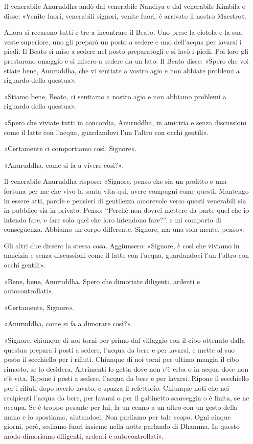 Il venerabile Anuruddha andò dal venerabile Nandiya e dal venerabile
Kimbila e disse: «Venite fuori, venerabili signori, venite fuori, è
arrivato il nostro Maestro».


Allora si recarono tutti e tre a incontrare il Beato. Uno prese la
ciotola e la sua veste superiore, uno gli preparò un posto a sedere e
uno dell’acqua per lavarsi i piedi. Il Beato si mise a sedere nel posto
preparatogli e si lavò i piedi. Poi loro gli prestarono omaggio e si
misero a sedere da un lato. Il Beato disse: «Spero che voi stiate bene,
Anuruddha, che vi sentiate a vostro agio e non abbiate problemi a
riguardo della questua».


«Stiamo bene, Beato, ci sentiamo a nostro agio e non abbiamo problemi a
riguardo della questua».


«Spero che viviate tutti in concordia, Anuruddha, in amicizia e senza
discussioni come il latte con l’acqua, guardandovi l’un l’altro con
occhi gentili».


«Certamente ci comportiamo così, Signore».


«Anuruddha, come si fa a vivere così?».


Il venerabile Anuruddha rispose: «Signore, penso che sia un profitto e
una fortuna per me che vivo la santa vita qui, avere compagni come
questi. Mantengo in essere atti, parole e pensieri di gentilezza
amorevole verso questi venerabili sia in pubblico sia in privato. Penso:
“Perché non dovrei mettere da parte quel che io intendo fare, e fare
solo quel che loro intendono fare?”. e mi comporto di conseguenza.
Abbiamo un corpo differente, Signore, ma una sola mente, penso».


Gli altri due dissero la stessa cosa. Aggiunsero: «Signore, è così che
viviamo in amicizia e senza discussioni come il latte con l’acqua,
guardandoci l’un l’altro con occhi gentili».


«Bene, bene, Anuruddha. Spero che dimoriate diligenti, ardenti e
autocontrollati».


«Certamente, Signore».


«Anuruddha, come si fa a dimorare così?».


«Signore, chiunque di noi torni per primo dal villaggio con il cibo
ottenuto dalla questua prepara i posti a sedere, l’acqua da bere e per
lavarsi, e mette al suo posto il secchiello per i rifiuti. Chiunque di
noi torni per ultimo mangia il cibo rimasto, se lo desidera. Altrimenti
lo getta dove non c’è erba o in acqua dove non c’è vita. Ripone i posti
a sedere, l’acqua da bere e per lavarsi. Ripone il secchiello per i
rifiuti dopo averlo lavato, e spazza il refettorio. Chiunque noti che
nei recipienti l’acqua da bere, per lavarsi o per il gabinetto
scarseggia o è finita, se ne occupa. Se è troppo pesante per lui, fa un
cenno a un altro con un gesto della mano e lo spostiamo, aiutandoci. Non
parliamo per tale scopo. Ogni cinque giorni, però, sediamo fuori insieme
nella notte parlando di Dhamma. In questo modo dimoriamo diligenti,
ardenti e autocontrollati».


